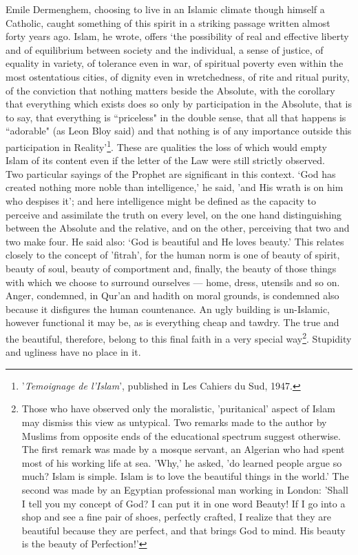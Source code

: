 \documentclass[10pt, twoside,openright]{book}
\begin{document}
Emile Dermenghem, choosing to live in an Islamic climate though himself a Catholic, caught something 
of this spirit in a striking passage written almost forty years ago. Islam, he wrote, offers `the 
possibility of real and effective liberty and of equilibrium between society and the individual, a 
sense of justice, of equality in variety, of tolerance even in war, of spiritual poverty even within 
the most ostentatious cities, of dignity even in wretchedness, of rite and ritual purity, of the 
conviction that nothing matters beside the Absolute, with the corollary that everything which exists 
does so only by participation in the Absolute, that is to say, that everything is ``priceless" in the 
double sense, that all that happens is ``adorable" (as Leon Bloy said) and that nothing is of any 
importance outside this participation in Reality'\footnote{'\emph{Temoignage de l'Islam}', published in Les Cahiers du Sud, 1947.}. These are qualities the loss of which would empty Islam of its content even if the letter of the Law were still strictly observed. \\

Two particular sayings of the Prophet are significant in this context. `God has created nothing more 
noble than intelligence,' he said, 'and His wrath is on him who despises it'; and here intelligence 
might be defined as the capacity to perceive and assimilate the truth on every level, on the one hand 
distinguishing between the Absolute and the relative, and on the other, perceiving that two and two 
make four. He said also: `God is beautiful and He loves beauty.' This relates closely to the concept 
of 'fitrah', for the human norm is one of beauty of spirit, beauty of soul, beauty of comportment 
and, finally, the beauty of those things with which we choose to surround ourselves --- home, dress, 
utensils and so on. Anger, condemned, in Qur'an and hadith on moral grounds, is condemned also 
because it disfigures the human countenance. An ugly building is un-Islamic, however functional it may 
be, as is everything cheap and tawdry. The true and the beautiful, therefore, belong to this final 
faith in a very special way\footnote{Those who have observed only the moralistic, 'puritanical' aspect of Islam may dismiss this view as untypical. Two remarks made to the author by Muslims from opposite ends of the educational spectrum suggest otherwise. The first remark was made by a mosque servant, an Algerian who had spent most of his working life at sea. 'Why,' he asked, 'do learned people argue so much? Islam is simple. Islam is to love the beautiful things in the world.' The second was made by an Egyptian professional man working in London: 'Shall I tell you my concept of God? I can put it in one word Beauty! If I go into a shop and see a fine pair of shoes, perfectly crafted, I realize that they are beautiful because they are perfect, and that brings God to mind. His beauty is the beauty of Perfection!'}. Stupidity and ugliness have no place in it. \\
\end{document}
